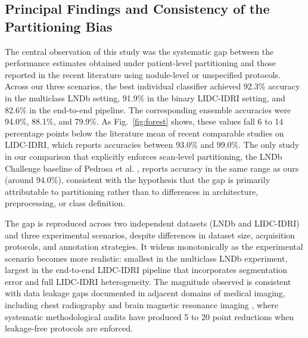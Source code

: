 \documentclass{ieeeaccess}
\begin{document}
\subsection{Principal Findings and Consistency of the Partitioning Bias}
The central observation of this study was the systematic gap between the performance estimates obtained under patient-level partitioning and those reported in the recent literature using nodule-level or unspecified protocols. Across our three scenarios, the best individual classifier achieved 92.3\% accuracy in the multiclass LNDb setting, 91.9\% in the binary LIDC-IDRI setting, and 82.6\% in the end-to-end pipeline. The corresponding ensemble accuracies were 94.0\%, 88.1\%, and 79.9\%. As Fig.~\ref{fig:forest} shows, these values fall 6 to 14 percentage points below the literature mean of recent comparable studies on LIDC-IDRI, which reports accuracies between 93.0\% and 99.0\%. The only study in our comparison that explicitly enforces scan-level partitioning, the LNDb Challenge baseline of Pedrosa et al. \cite{pedrosa2021}, reports accuracy in the same range as ours (around 94.0\%), consistent with the hypothesis that the gap is primarily attributable to partitioning rather than to differences in architecture, preprocessing, or class definition.

The gap is reproduced across two independent datasets (LNDb and LIDC-IDRI) and three experimental scenarios, despite differences in dataset size, acquisition protocols, and annotation strategies. It widens monotonically as the experimental scenario becomes more realistic: smallest in the multiclass LNDb experiment, largest in the end-to-end LIDC-IDRI pipeline that incorporates segmentation error and full LIDC-IDRI heterogeneity. The magnitude observed is consistent with data leakage gaps documented in adjacent domains of medical imaging, including chest radiography \cite{roberts2021} and brain magnetic resonance imaging \cite{wen2020}, where systematic methodological audits have produced 5 to 20 point reductions when leakage-free protocols are enforced.
\end{document}
